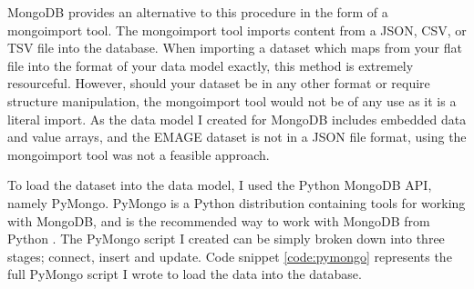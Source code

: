MongoDB provides an alternative to this procedure in the form of a mongoimport tool. The mongoimport tool imports content from a JSON, CSV, or TSV file into the database. When importing a dataset which maps from your flat file into the format of your data model exactly, this method is extremely resourceful. However, should your dataset be in any other format or require structure manipulation, the mongoimport tool would not be of any use as it is a literal import. As the data model I created for MongoDB includes embedded data and value arrays, and the EMAGE dataset is not in a JSON file format, using the mongoimport tool was not a feasible approach.

To load the dataset into the data model, I used the Python MongoDB API, namely PyMongo. PyMongo is a Python distribution containing tools for working with MongoDB, and is the recommended way to work with MongoDB from Python \cite{mongo}. The PyMongo script I created can be simply broken down into three stages; connect, insert and update. Code snippet \ref{code:pymongo} represents the full PyMongo script I wrote to load the data into the database.


